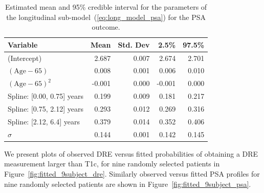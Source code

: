 \begin{table}[!htb]
\begin{center}
\caption{Estimated mean and 95\% credible interval for the parameters of the longitudinal sub-model~(\ref{eq:long_model_psa}) for the PSA outcome.}
\label{tab:PSA_long}
\begin{tabular}{lrrrr}
\hline
\hline
Variable                         & Mean & Std. Dev & 2.5\%  & 97.5\% \\
\hline
(Intercept) & 2.687 & 0.007 & 2.674 & 2.701 \\
$(\mbox{Age} - 65)$ & 0.008 & 0.001 & 0.006 & 0.010 \\
$(\mbox{Age} - 65)^2$ & -0.001 & 0.000 & -0.001 & 0.000 \\
Spline: [0.00, 0.75] years & 0.199 & 0.009 & 0.181 & 0.217 \\
Spline: [0.75, 2.12] years & 0.293 & 0.012 & 0.269 & 0.316 \\
Spline: [2.12, 6.4] years & 0.379 & 0.014 & 0.352 & 0.406\\
$\sigma$ & 0.144 & 0.001 & 0.142 & 0.145\\
\hline
\end{tabular}
\end{center}
\end{table}

We present plots of observed DRE versus fitted probabilities of obtaining a DRE measurement larger than T1c, for nine randomly selected patients in Figure~\ref{fig:fitted_9subject_dre}. Similarly observed versus fitted PSA profiles for nine randomly selected patients are shown in Figure~\ref{fig:fitted_9subject_psa}. 

